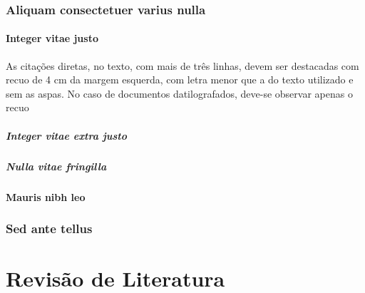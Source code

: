 \documentclass[12pt,openright,twoside,a4paper]{abntex2}
\begin{document}
\lipsum[5]

\section{Aliquam consectetuer varius nulla}

\lipsum[6-7]

\subsection{Integer vitae justo}

\lipsum[8]

\begin{citacao}
As citações diretas, no texto, com mais de três linhas, devem ser
destacadas com recuo de 4 cm da margem esquerda, com letra menor que a do texto
utilizado e sem as aspas. No caso de documentos datilografados, deve-se
observar apenas o recuo \cite[5.3]{NBR10520:2002}
\end{citacao}

\lipsum[9]

\subsubsection{Integer vitae extra justo}

\lipsum[9-10]

\subsubsection{Nulla vitae fringilla}

\lipsum[11-12]

\subsection{Mauris nibh leo}

\lipsum[12-13]

\section{Sed ante tellus}

\lipsum[14-15]

\part{Revisão de Literatura}
\end{document}
